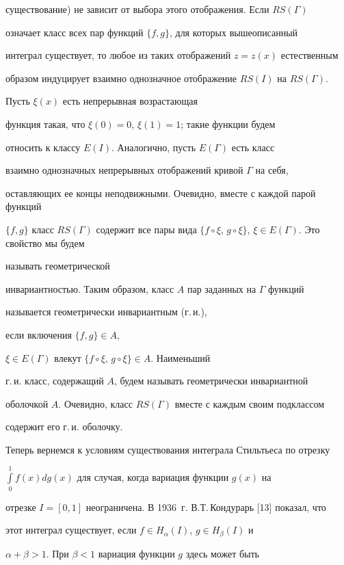 существование) не зависит от выбора этого отображения. Если $RS(\Gamma)$


означает класс всех пар функций $\{f,g\}$, для которых вышеописанный


интеграл существует, то любое из таких отображений $z=z(x)$ естественным


образом индуцирует взаимно однозначное отображение $RS(I)$ на $RS(\Gamma)$.


Пусть $\xi (x)$ есть непрерывная возрастающая


функция такая, что $\xi (0) = 0$, $\xi (1) = 1$; такие функции будем


относить к классу $E(I)$. Аналогично, пусть $E(\Gamma)$ есть класс


взаимно однозначных непрерывных отображений кривой $\Gamma$ на себя,


оставляющих ее концы неподвижными. Очевидно, вместе с каждой парой функций


$\{f,g\}$ класс $RS(\Gamma)$ содержит все пары вида $\{f\circ\xi,\,


g\circ\xi\}$, $\xi\in E(\Gamma)$. Это свойство мы будем


называть геометрической


инвариантностью. Таким образом, класс $A$ пар заданных на $\Gamma$ функций


называется геометрически инвариантным (г.\,и.),


если включения $\{f,g\}\in A$,


$\xi\in E(\Gamma)$ влекут $\{f\circ\xi,\, g\circ\xi\}\in A$. Наименьший


г.\,и. класс, содержащий $A$, будем называть геометрически инвариантной


оболочкой $A$. Очевидно, класс $RS(\Gamma)$ вместе с каждым своим подклассом


содержит его г.\,и. оболочку.





Теперь вернемся к условиям существования интеграла Стильтьеса по отрезку


$\int\limits_{0}^{1}{f(x)dg(x)}$ для случая, когда вариация функции $g(x)$ на


отрезке $I=[0,1]$ неограничена. В 1936~г. В.Т.\,Кондурарь [13] показал, что


этот интеграл существует, если $f\in H_{\alpha}(I)$, $g\in H_{\beta}(I)$ и


$\alpha +\beta >1$. При $\beta <1$ вариация функции $g$ здесь может быть


